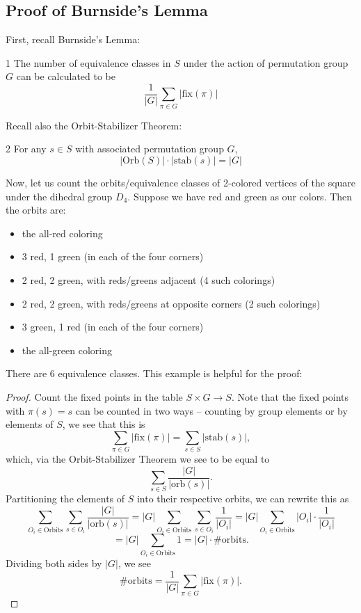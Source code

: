 \subsection{Proof of Burnside's Lemma}
First, recall Burnside's Lemma: 

\begin{lemma}1
    The number of equivalence classes in $S$ under the action of permutation 
    group $G$ can be calculated to be
    \[ \frac 1{|G|} \sum_{\pi \in G} |\mathrm{fix}(\pi)| \]
\end{lemma}
Recall also the Orbit-Stabilizer Theorem: 
\begin{theorem}2
    For any $s \in S$ with associated permutation group $G$, 
    \[ |\text{Orb}(S)| \cdot |\text{stab}(s)| = |G| \]
\end{theorem}
Now, let us count the orbits/equivalence classes of 2-colored vertices of the
square under the dihedral group $D_4$. Suppose we have red and green as our colors. 
Then the orbits are: 
\begin{itemize}
    \item the all-red coloring 
    \item 3 red, 1 green (in each of the four corners)
    \item 2 red, 2 green, with reds/greens adjacent (4 such colorings)
    \item 2 red, 2 green, with reds/greens at opposite corners (2 such colorings)
    \item 3 green, 1 red (in each of the four corners)
    \item the all-green coloring 
\end{itemize}
There are 6 equivalence classes. This example is helpful for the proof: 
\begin{proof}
    Count the fixed points in the table $S \times G \to S$. Note that 
    the fixed points with $\pi(s) = s$ can be counted in two ways -- counting
    by group elements or by elements of $S$, we see that this is 
    \[ \sum_{\pi \in G} |\mathrm{fix}(\pi)| = \sum_{s \in S} |\text{stab}(s)|, \]
    which, via the Orbit-Stabilizer Theorem we see to be equal to $$\sum_{s \in S} \frac{|G|}{|\text{orb}(s)|}.$$ 
    Partitioning the elements of $S$ into their respective orbits, we can rewrite this
    as 
    \[
        \sum_{O_i \in \text{Orbits}} \sum_{s \in O_i} \frac{|G|}{|\text{orb}(s)|} = 
        |G| \sum_{O_i \in \text{Orbits}} \sum_{s \in O_i} \frac 1{|O_i|} =
        |G| \sum_{O_i \in \text{Orbits}} |O_i| \cdot \frac 1{|O_i|}
    \]
    \[
        = |G| \sum_{O_i \in \text{Orbits}} 1 = |G| \cdot \text{\#orbits}.
    \]
    Dividing both sides by $|G|$, we see 
    \[
        \text{\#orbits} = \frac 1{|G|}\sum_{\pi \in G} |\mathrm{fix}(\pi)|.
    \]

\end{proof}

